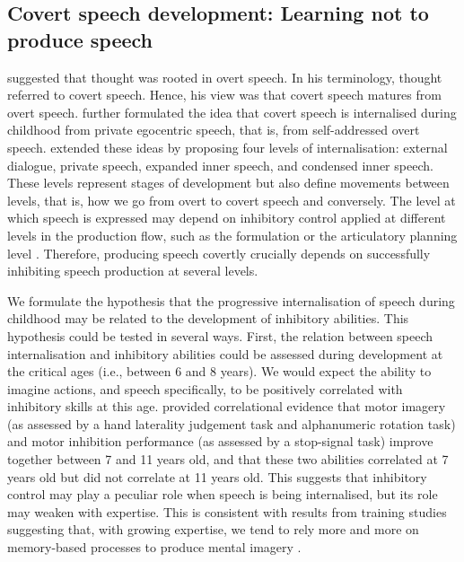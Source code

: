 \documentclass[utf8]{template/frontiersSCNS} %
\begin{document}
\subsection{Covert speech development: Learning not to produce speech}


\cite{watson_psychology_1919} suggested that thought was rooted in overt speech. In his terminology, thought referred to covert speech. Hence, his view was that covert speech matures from overt speech. \cite{vygotsky_thought_1934} further formulated the idea that covert speech is internalised during childhood from private egocentric speech, that is, from self-addressed overt speech. \cite{fernyhough_alien_2004} extended these ideas by proposing four levels of internalisation: external dialogue, private speech, expanded inner speech, and condensed inner speech. These levels represent stages of development but also define movements between levels, that is, how we go from overt to covert speech and conversely. The level at which speech is expressed may depend on inhibitory control applied at different levels in the production flow, such as the formulation or the articulatory planning level \citep{grandchamp_condialint_2019}. Therefore, producing speech covertly crucially depends on successfully inhibiting speech production at several levels. 

We formulate the hypothesis that the progressive internalisation of speech during childhood may be related to the development of inhibitory abilities. This hypothesis could be tested in several ways. First, the relation between speech internalisation and inhibitory abilities could be assessed during development at the critical ages (i.e., between 6 and 8 years). We would expect the ability to imagine actions, and speech specifically, to be positively correlated with inhibitory skills at this age. \cite{wang_relationship_2021} provided correlational evidence that motor imagery (as assessed by a hand laterality judgement task and alphanumeric rotation task) and motor inhibition performance (as assessed by a stop-signal task) improve together between 7 and 11 years old, and that these two abilities correlated at 7 years old but did not correlate at 11 years old. This suggests that inhibitory control may play a peculiar role when speech is being internalised, but its role may weaken with expertise. This is consistent with results from training studies suggesting that, with growing expertise, we tend to rely more and more on memory-based processes to produce mental imagery \citep[e.g.,][]{tarr_mental_1989, jolicoeur_time_1985}.
\end{document}
